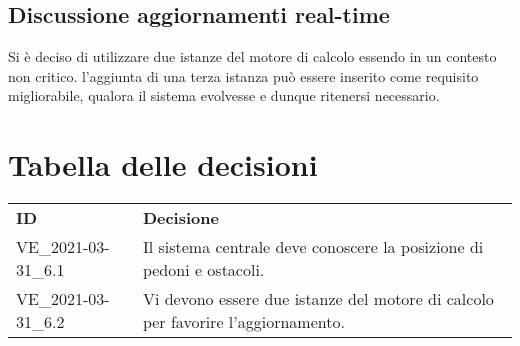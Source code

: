 \documentclass[]{article}
\begin{document}
	\subsection{Discussione aggiornamenti real-time}
 	Si è deciso di utilizzare due istanze del motore di calcolo essendo in un contesto non critico.
 	l'aggiunta di una terza istanza può essere inserito come requisito migliorabile, qualora il sistema evolvesse e dunque ritenersi necessario.
	\newpage

	\section{Tabella delle decisioni}

	\begin{table} [h!]
		\begin{center}
			\begin{tabular} { m{2cm} m{14cm} }
				\rowcolor{lightgray}
				\textbf{ID} & \textbf{Decisione}\\
				VE_2021-03-31_6.1 & Il sistema centrale deve conoscere la posizione di pedoni e ostacoli.\\
				VE_2021-03-31_6.2 & Vi devono essere due istanze del motore di calcolo per favorire l'aggiornamento.\\

			\end{tabular}
		\end{center}
	\end{table}
\end{document}
